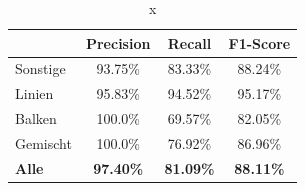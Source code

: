 \begin{table}[H]
    \centering
    \begin{tabular}{|l|c|c|c|}
        \hline
        \rowcolor[HTML]{EFEFEF}
                      & Precision        & Recall           & F1-Score         \\ \hline
        Sonstige      & 93.75\%          & 83.33\%          & 88.24\%          \\ \hline
        Linien        & 95.83\%          & 94.52\%          & 95.17\%          \\ \hline
        Balken        & 100.0\%          & 69.57\%          & 82.05\%          \\ \hline
        Gemischt      & 100.0\%          & 76.92\%          & 86.96\%          \\ \hline
        \textbf{Alle} & \textbf{97.40\%} & \textbf{81.09\%} & \textbf{88.11\%} \\ \hline
    \end{tabular}
    \caption{x}
\end{table}


